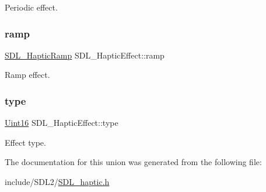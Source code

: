 Periodic effect. \mbox{\label{union_s_d_l___haptic_effect_a1d32ef4c2d1cc89dc938b392f6ad81bd}} 
\subsubsection{\texorpdfstring{ramp}{ramp}}
{\footnotesize\ttfamily \hyperlink{struct_s_d_l___haptic_ramp}{S\+D\+L\+\_\+\+Haptic\+Ramp} S\+D\+L\+\_\+\+Haptic\+Effect\+::ramp}

Ramp effect. \mbox{\label{union_s_d_l___haptic_effect_a5ff6cfd8da91537091e9a6c2108cb179}} 
\subsubsection{\texorpdfstring{type}{type}}
{\footnotesize\ttfamily \hyperlink{_s_d_l__stdinc_8h_a31fcc0a076c9068668173ee26d33e42b}{Uint16} S\+D\+L\+\_\+\+Haptic\+Effect\+::type}

Effect type. 

The documentation for this union was generated from the following file\+:\begin{DoxyCompactItemize}
\item 
include/\+S\+D\+L2/\hyperlink{_s_d_l__haptic_8h}{S\+D\+L\+\_\+haptic.\+h}\end{DoxyCompactItemize}
